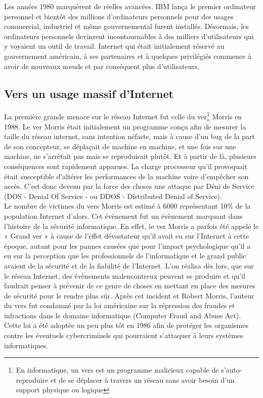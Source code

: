 Les années 1980 marquèrent de réelles avancées. IBM lança le premier ordinateur personnel et bientôt des millions d’ordinateurs personnels pour des usages commercial, industriel et même gouvernemental furent installés. Désormais, les ordinateurs personnels devinrent incontournables à des milliers d’utilisateurs qui y voyaient un outil de travail. Internet qui était initialement réservé au gouvernement américain, à ses partenaires et à quelques privilégiés commence à avoir de nouveaux nœuds et par conséquent plus d’utilisateurs. 
\subsection{Vers un usage massif d'Internet}
La première grande menace sur le réseau Internet fut celle du ver\footnote{En informatique, un vers est un programme malicieux capable de s’auto-reproduire et de se déplacer à travers un réseau sans avoir besoin d’un support physique ou logique} Morris \cite{morris-worm} en 1988. Le ver Morris  était initialement un programme conçu afin de mesurer la taille du réseau internet, sans intention néfaste, mais à cause d’un bug de la part de son concepteur, se déplaçait de machine en machine, et une fois sur une machine, ne s’arrêtait pas mais se reproduisait plutôt. Et à partir de là, plusieurs conséquences sont rapidement apparues. La charge processeur qu’il provoquait était susceptible d’altérer les performances de la machine voire d’empêcher son accès. C’est donc devenu par la force des choses une attaque par Déni de Service (DOS   - Denial Of Service - ou DDOS - Distributed Denial of Service). \\
Le nombre de victimes du vers Morris est estimé à 6000 représentant 10\% de la population Internet d’alors. Cet évènement fut un évènement marquant dans l’histoire de la sécurité informatique. En  effet, le ver Morris a parfois été appelé le « Grand ver » à cause de l'effet dévastateur qu'il avait eu sur l'Internet à cette époque, autant pour les pannes causées que pour l'impact psychologique qu'il a eu sur la perception que les professionnels de l’informatique et le grand public avaient de la sécurité et de la fiabilité de l'Internet. L’on réalisa dès lors, que sur le réseau Internet, des évènements malencontreux peuvent se produire et qu’il faudrait penser à prévenir de ce genre de choses en mettant en place des mesures de sécurité pour le rendre plus sûr. Après cet incident et Robert Morris, l’auteur du vers fut condamné par la loi américaine sur la répression des fraudes et infractions dans le domaine informatique (Computer Fraud and Abuse Act). Cette loi a été adoptée un peu plus tôt en 1986 afin de protéger les organismes contre les éventuels cybercriminels qui pourraient s’attaquer à leurs systèmes informatiques.
